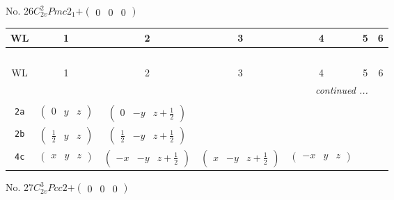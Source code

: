 \documentclass[fleqn,9pt,landscape]{jsarticle}
\begin{document}
\newpage
No. 26\quad$C_{2v}^{2}$\quad$Pmc2_1$\quad[ orthorhombic ]\quad$+\begin{pmatrix} 0 & 0 & 0 \end{pmatrix}$
\begin{center}
\renewcommand{\arraystretch}{1.2}
\begin{longtable}{ccccccc}
 \hline \hline
WL & 1 & 2 & 3 & 4 & 5 & 6 \\ \hline \endfirsthead

\multicolumn{6}{l}{\tablename\ \thetable{}} \\
 \hline \hline
WL & 1 & 2 & 3 & 4 & 5 & 6 \\ \hline \endhead

 \hline \hline
\multicolumn{6}{r}{\footnotesize\it continued ...} \\ \endfoot

 \hline \hline
\multicolumn{6}{r}{} \\ \endlastfoot

{\tt 2a} & $ \begin{pmatrix} 0 & y & z \end{pmatrix} $ & $ \begin{pmatrix} 0 & - y & z + \frac{1}{2} \end{pmatrix} $ & $  $ & $  $ \\ \hline
{\tt 2b} & $ \begin{pmatrix} \frac{1}{2} & y & z \end{pmatrix} $ & $ \begin{pmatrix} \frac{1}{2} & - y & z + \frac{1}{2} \end{pmatrix} $ & $  $ & $  $ \\ \hline
{\tt 4c} & $ \begin{pmatrix} x & y & z \end{pmatrix} $ & $ \begin{pmatrix} - x & - y & z + \frac{1}{2} \end{pmatrix} $ & $ \begin{pmatrix} x & - y & z + \frac{1}{2} \end{pmatrix} $ & $ \begin{pmatrix} - x & y & z \end{pmatrix} $ \\
\end{longtable}
\end{center}
\newpage
No. 27\quad$C_{2v}^{3}$\quad$Pcc2$\quad[ orthorhombic ]\quad$+\begin{pmatrix} 0 & 0 & 0 \end{pmatrix}$
\end{document}
